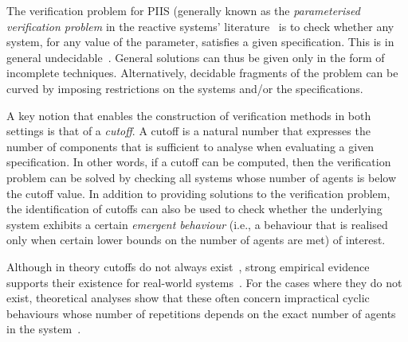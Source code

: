 \documentclass{article}
\begin{document}
The verification problem for PIIS (generally known as the {\em parameterised
verification problem} in the reactive systems' literature~\cite{Bloem+15} is to
check whether any system, for any value of the parameter, satisfies a given
specification.  This is in general undecidable~\cite{KouvarosLomuscio16a}.
General solutions can thus be given only in the form of incomplete techniques.
Alternatively, decidable fragments of the problem can be curved by imposing
restrictions on the systems and/or the specifications.  

A key notion that enables the construction of verification methods in both
settings is that of a {\em cutoff}.  A cutoff is a natural number that expresses
the number of components that is sufficient to analyse when evaluating a given 
specification. In other words, if a cutoff can be computed, then the
verification problem can be solved by checking all systems whose number of
agents is below the cutoff value.  In addition to providing solutions to the
verification problem, the identification of cutoffs can also be used to check
whether the underlying system exhibits a certain {\em emergent behaviour} (i.e.,
a behaviour that is realised  only when certain lower bounds on the number of
agents are met) of interest.


Although in theory  cutoffs do not always exist~\cite{KouvarosLomuscio13b},
strong empirical evidence supports their existence for real-world
systems~\cite{EmersonKahlon00,EmersonNamjoshi95,Benjamin+14}.  For the cases
where they do not exist, theoretical analyses show that these often concern
impractical cyclic behaviours whose number of repetitions depends on the exact
number of agents in the system~\cite{KouvarosLomuscio13b}.
\end{document}
